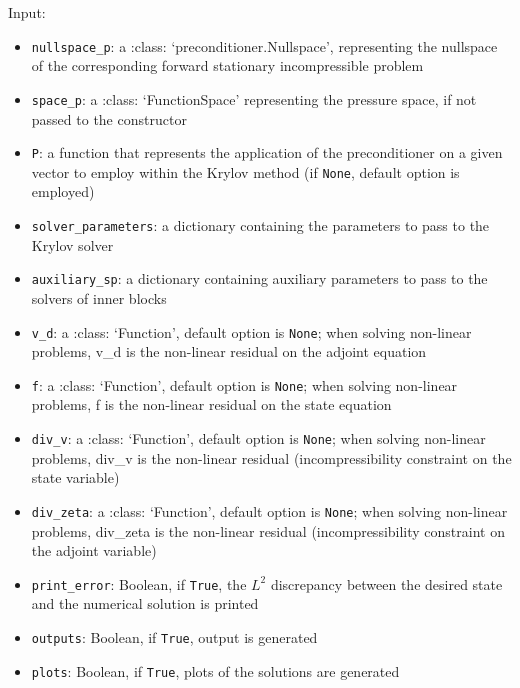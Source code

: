 \documentclass[letterpaper,10pt,english]{sphinxmanual}
\begin{document}
Input:
\begin{itemize}
\item \texttt{nullspace{\_}p}: a :class: `preconditioner.Nullspace', representing
            the nullspace of the corresponding forward stationary
            incompressible problem

\item \texttt{space{\_}p}: a :class: `FunctionSpace' representing the pressure
            space, if not passed to the constructor

\item \texttt{P}: a function that represents the application of the
            preconditioner on a given vector to employ within the Krylov
            method (if \texttt{None}, default option is employed)

\item \texttt{solver{\_}parameters}: a dictionary containing the parameters to pass
            to the Krylov solver

\item \texttt{auxiliary{\_}sp}: a dictionary containing auxiliary parameters to
            pass to the solvers of inner blocks

\item \texttt{v{\_}d}: a :class: `Function', default option is \texttt{None}; when solving
            non-linear problems, v\_d is the non-linear residual on the adjoint
            equation

\item \texttt{f}: a :class: `Function', default option is \texttt{None}; when solving
            non-linear problems, f is the non-linear residual on the state
            equation

\item \texttt{div{\_}v}: a :class: `Function', default option is \texttt{None}; when solving
            non-linear problems, div\_v is the non-linear residual
            (incompressibility constraint on the state variable)

\item \texttt{div{\_}zeta}: a :class: `Function', default option is \texttt{None}; when
            solving non-linear problems, div\_zeta is the non-linear residual
            (incompressibility constraint on the adjoint variable)

\item \texttt{print{\_}error}: Boolean, if \texttt{True}, the $L^2$ discrepancy between the desired state and the numerical solution is printed

\item \texttt{outputs}: Boolean, if \texttt{True}, output is generated

\item \texttt{plots}: Boolean, if \texttt{True}, plots of the solutions are generated
\end{itemize}
\end{document}
